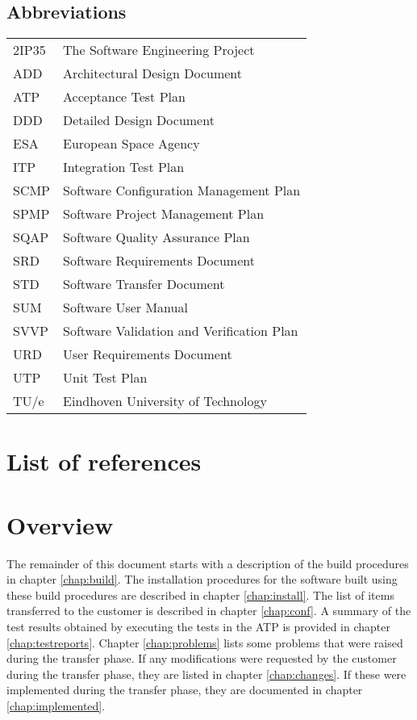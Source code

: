 \subsection{Abbreviations}
\begin{tabular}{l|l}
2IP35 & The Software Engineering Project \\
ADD & Architectural Design Document \\
ATP & Acceptance Test Plan \\
DDD & Detailed Design Document \\
ESA & European Space Agency \\
ITP & Integration Test Plan \\
SCMP & Software Configuration Management Plan \\
SPMP & Software Project Management Plan \\
SQAP & Software Quality Assurance Plan \\
SRD & Software Requirements Document \\
STD & Software Transfer Document \\
SUM & Software User Manual \\
SVVP & Software Validation and Verification Plan \\
URD & User Requirements Document \\
UTP & Unit Test Plan \\
TU/e  & Eindhoven University of Technology \\
\end{tabular}

\section{List of references}


\section{Overview}
The remainder of this document starts with a description of the build procedures in chapter \ref{chap:build}. The installation procedures for the software built using these build procedures are described in chapter \ref{chap:install}. The list of items transferred to the customer is described in chapter \ref{chap:conf}. A summary of the test results obtained by executing the tests in the ATP \cite{atp} is provided in chapter \ref{chap:testreports}. Chapter \ref{chap:problems} lists some problems that were raised during the transfer phase. If any modifications were requested by the customer during the transfer phase, they are listed in chapter \ref{chap:changes}. If these were implemented during the transfer phase, they are documented in chapter \ref{chap:implemented}.